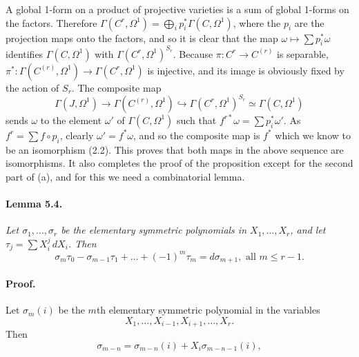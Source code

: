 A global 1-form on a product of projective varieties is a sum of global
1-forms on the factors. Therefore
$\Gamma(C^r, \Omega^1) = \bigoplus_i p_i^* \Gamma(C, \Omega^1)$, where the
$p_i$ are the projection maps onto the factors, and so it is clear that the
map $\omega \mapsto \sum p_i^* \omega$ identifies $\Gamma(C, \Omega^1)$ with
$\Gamma(C^r, \Omega^1)^{S_r}$. Because $\pi \colon C^r \to C^{(r)}$ is
separable,
$\pi^* \colon \Gamma(C^{(r)}, \Omega^1) \to \Gamma(C^r, \Omega^1)$ is
injective, and its image is obviously fixed by the action of $S_r$. The
composite map
\[
  \Gamma(J, \Omega^1) \to \Gamma(C^{(r)}, \Omega^1) \hookrightarrow
  \Gamma(C^r, \Omega^1)^{S_r} \simeq \Gamma(C, \Omega^1)
\]
sends $\omega$ to the element $\omega'$ of $\Gamma(C, \Omega^1)$ such that
$f^{r*} \omega = \sum p_i^* \omega'$. As $f^r = \sum f \circ p_i$, clearly
$\omega' = f^* \omega$, and so the composite map is $f^*$ which we know to be
an isomorphism (2.2). This proves that both maps in the above sequence are
isomorphisms. It also completes the proof of the proposition except for the
second part of (a), and for this we need a combinatorial lemma.

\paragraph{Lemma 5.4.}
\textit{Let $\sigma_1, \dots, \sigma_r$ be the elementary symmetric
polynomials in $X_1, \dots, X_r$, and let $\tau_j = \sum X_i^j \, dX_i$.
Then}
\[
  \sigma_m \tau_0 - \sigma_{m-1} \tau_1 + \dots + (-1)^m \tau_m
  = d\sigma_{m+1}, \text{ all } m \le r - 1.
\]

\paragraph{Proof.}
Let $\sigma_m(i)$ be the $m$th elementary symmetric polynomial in the
variables
\[
  X_1, \dots, X_{i-1}, X_{i+1}, \dots, X_r.
\]
Then
\[
  \sigma_{m-n} = \sigma_{m-n}(i) + X_i \sigma_{m-n-1}(i),
\]
